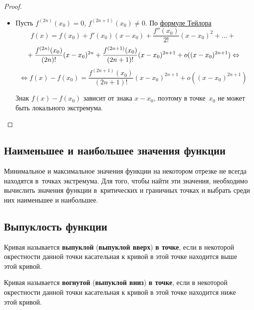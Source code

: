 \begin{enumerate}
\begin{proof}
\begin{itemize}
		\item Пусть $f^{(2n)}(x_0) = 0$, $f^{(2n+1)}(x_0) \neq 0$.
		По \hyperref[eq:Taylor_series]{формуле Тейлора}
		\begin{equation*}
		f(x) = f(x_0) + f'(x_0)(x - x_0) + \frac{f''(x_0)}{2!} (x - x_0)^2 + \ldots +
		\end{equation*}
		\begin{equation*}
		\vphantom1 + \frac{f^{(2n)}(x_0)}{(2n)!} (x - x_0)^{2n} + \frac{f^{(2n+1)}(x_0)}{(2n+1)!} (x - x_0)^{2n+1} + o((x - x_0)^{2n+1}) \Leftrightarrow
		\end{equation*}
		\begin{equation*}
		\Leftrightarrow f(x) - f(x_0) = \frac{f^{(2n+1)}(x_0)}{(2n+1)!} (x - x_0)^{2n+1} + o((x - x_0)^{2n+1})
		\end{equation*}
		
		Знак $f(x) - f(x_0)$ зависит от знака $x - x_0$, поэтому в точке~$x_0$ не может быть локального экстремума.
	\end{itemize}
	\end{proof}
\end{enumerate}

\subsection{Наименьшее и наибольшее значения функции}
Минимальное и максимальное значения функции на некотором отрезке не всегда находятся в~точках экстремума.
Для того, чтобы найти эти значения, необходимо вычислить значения функции в~критических и граничных точках и выбрать среди них наименьшее и наибольшее.

\subsection{Выпуклость функции}
Кривая называется \textbf{выпуклой} (\textbf{выпуклой вверх}) \textbf{в точке}, если в некоторой окрестности данной точки касательная к кривой в этой точке находится выше этой кривой.

Кривая называется \textbf{вогнутой} (\textbf{выпуклой вниз}) \textbf{в точке}, если в некоторой окрестности данной точки касательная к кривой в этой точке находится ниже этой кривой.

